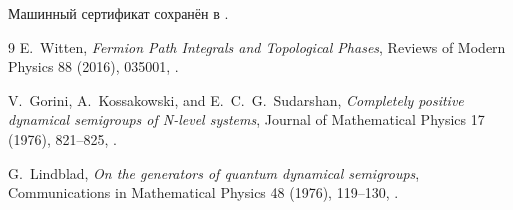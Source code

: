 Машинный сертификат сохранён в
.

\begin{thebibliography}{9}
E.~Witten,
\emph{Fermion Path Integrals and Topological Phases},
Reviews of Modern Physics 88 (2016), 035001,
.

V.~Gorini, A.~Kossakowski, and E.~C.~G.~Sudarshan,
\emph{Completely positive dynamical semigroups of N-level systems},
Journal of Mathematical Physics 17 (1976), 821--825,
.

G.~Lindblad,
\emph{On the generators of quantum dynamical semigroups},
Communications in Mathematical Physics 48 (1976), 119--130,
.
\end{thebibliography}